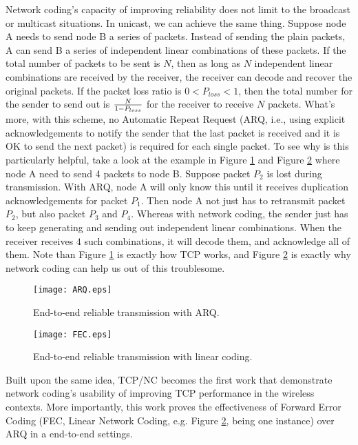 \documentclass[10pt, conference, final, letterpaper]{IEEEtran}
\theoremstyle{definition}
\begin{document}
Network coding's capacity of improving reliability does not limit to the broadcast or multicast situations. In unicast, we can achieve the same thing. Suppose node A needs to send node B a series of packets. Instead of sending the plain packets, A can send B a series of independent linear combinations of these packets. If the total number of packets to be sent is $N$, then as long as $N$ independent linear combinations are received by the receiver, the receiver can decode and recover the original packets. If the packet loss ratio is $0 < P_{loss} < 1$, then the total number for the sender to send out is $N \over 1 - P_{loss}$ for the receiver to receive $N$ packets. What's more, with this scheme, no Automatic Repeat Request (ARQ, i.e., using explicit acknowledgements to notify the sender that the last packet is received and it is OK to send the next packet) is required for each single packet. To see why is this particularly helpful, take a look at the example in Figure \ref{fig:ARQ} and Figure \ref{fig:FEC} where node A need to send 4 packets to node B. Suppose packet $P_{2}$ is lost during transmission. With ARQ, node A will only know this until it receives duplication acknowledgements for packet $P_{1}$. Then node A not just has to retransmit packet $P_{2}$, but also packet $P_{3}$ and $P_{4}$. Whereas with network coding, the sender just has to keep generating and sending out independent linear combinations. When the receiver receives $4$ such combinations, it will decode them, and acknowledge all of them. Note than Figure \ref{fig:ARQ} is exactly how TCP works, and Figure \ref{fig:FEC} is exactly why network coding can help us out of this troublesome.

\begin{figure}[hbt]
	\begin{center}
		\texttt{[image: ARQ.eps]}
	\end{center}
	\caption{End-to-end reliable transmission with ARQ.}
	\label{fig:ARQ}
\end{figure}

\begin{figure}[hbt]
	\begin{center}
		\texttt{[image: FEC.eps]}
	\end{center}
	\caption{End-to-end reliable transmission with linear coding.}
	\label{fig:FEC}
\end{figure}

Built upon the same idea, TCP/NC \cite{TCPNC} becomes the first work that demonstrate network coding's usability of improving TCP performance in the wireless contexts. More importantly, this work proves the effectiveness of Forward Error Coding (FEC, Linear Network Coding, e.g. Figure \ref{fig:FEC}, being one instance) over ARQ in a end-to-end settings.
\end{document}
